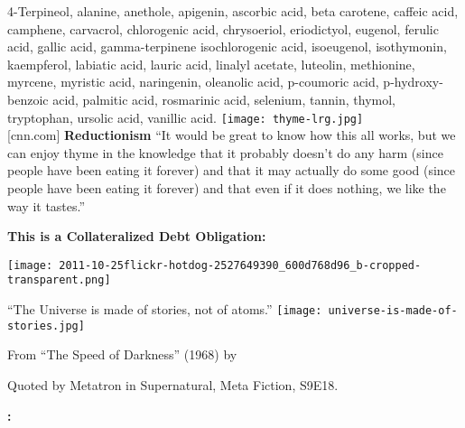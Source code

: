     \textbf{}
      4-Terpineol, alanine, anethole, apigenin, ascorbic acid, beta
      carotene, caffeic acid, camphene, carvacrol, chlorogenic acid,
      chrysoeriol, eriodictyol, eugenol, ferulic acid, gallic acid,
      gamma-terpinene isochlorogenic acid, isoeugenol, isothymonin,
      kaempferol, labiatic acid, lauric acid, linalyl acetate, luteolin,
      methionine, myrcene, myristic acid, naringenin, oleanolic acid,
      p-coumoric acid, p-hydroxy-benzoic acid, palmitic acid, rosmarinic
      acid, selenium, tannin, thymol, tryptophan, ursolic acid, vanillic
      acid.
    \texttt{[image: thyme-lrg.jpg]}\\
    {\mbox{} \hfill \tiny [cnn.com]}
  \textbf{Reductionism}
  ``It would be great to know how this all works, but  we
  can enjoy thyme in the knowledge that it probably doesn't do any harm
  (since people have been eating it forever) and that it may actually do
  some good (since people have been eating it forever) and that even if
  it does nothing, we like the way it tastes.''

  \bigskip

  {
  }
\textbf{This is a Collateralized Debt Obligation:}

  \texttt{[image: 2011-10-25flickr-hotdog-2527649390\_600d768d96\_b-cropped-transparent.png]}

  \begin{center}
     
    ``The Universe is made of stories, not of atoms.''
    \texttt{[image: universe-is-made-of-stories.jpg]}
    
      From ``The Speed of Darkness'' (1968) by
    
      Quoted by Metatron in Supernatural, Meta Fiction, S9E18.
    
  \end{center}
  \textbf{
    :
  }
    
